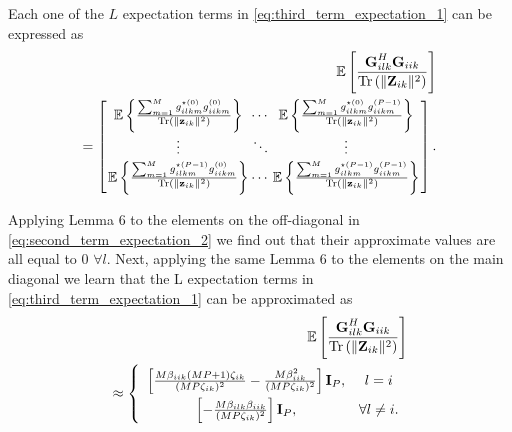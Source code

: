 \documentclass[10pt,journal,comsoc,final]{IEEEtran}
\DeclareMathOperator{\Tr}{Tr}
\begin{document}
Each one of the $L$ expectation terms in \eqref{eq:third_term_expectation_1} can be expressed as
\begin{equation}\label{eq:second_term_expectation_2}
\begin{split}
\mathbb{E} \left[ \frac{ \textbf{G}_{ilk}^{H} \textbf{G}_{iik}}{\Tr \left( \lVert \textbf{Z}_{ik} \rVert^{2} \right)} \right] \\ = 
\arraycolsep=1pt\def\arraystretch{1.5}
\left[\begin{array}{ccc} \mathbb{E} \left\lbrace \frac{\sum_{m=1}^{M} g_{ilkm}^{\star (0)} g_{iikm}^{(0)} }{\Tr \left( \lVert \textbf{z}_{ik} \rVert^{2} \right)} \right\rbrace & \cdots & \mathbb{E} \left\lbrace \frac{\sum_{m=1}^{M} g_{ilkm}^{\star (0)}g_{iikm}^{(P-1)} }{\Tr \left( \lVert \textbf{z}_{ik} \rVert^{2} \right)} \right\rbrace \\
\vdots & \ddots & \vdots \\
\mathbb{E} \left\lbrace \frac{\sum_{m=1}^{M} g_{ilkm}^{\star(P-1)}g_{iikm}^{(0)} }{\Tr \left( \lVert \textbf{z}_{ik} \rVert^{2} \right)}\right\rbrace & \cdots & \mathbb{E} \left\lbrace \frac{\sum_{m=1}^{M} g_{ilkm}^{\star (P-1)}g_{iikm}^{(P-1)} }{\Tr \left( \lVert \textbf{z}_{ik} \rVert^{2} \right)} \right\rbrace
\end{array} \right].
\end{split}
\end{equation}

Applying Lemma 6 to the elements on the off-diagonal in \eqref{eq:second_term_expectation_2} we find out that their approximate values are all equal to 0 $\forall l$. Next, applying the same Lemma 6 to the elements on the main diagonal we learn that the L expectation terms in \eqref{eq:third_term_expectation_1} can be approximated as
\begin{equation}\label{eq:second_term_expectation_3}
\begin{split}
\mathbb{E} \left[ \frac{ \textbf{G}_{ilk}^{H} \textbf{G}_{iik}}{\Tr \left( \lVert \textbf{Z}_{ik} \rVert^{2} \right)} \right] \\ \approx \left\{
\def\arraystretch{1.7}
\begin{array}{cc}
\left[ \frac{M\beta_{iik}(MP+1) \zeta_{ik}}{(MP \zeta_{ik})^{2}} - \frac{M \beta_{iik}^{2}}{(MP \zeta_{ik})^{2}} \right] \textbf{I}_{P},  & l = i\\
\left[-\frac{M \beta_{ilk} \beta_{iik}}{(MP \zeta_{ik})^{2}} \right] \textbf{I}_{P}, & \forall l \neq i.
\end{array}\right.
\end{split}
\end{equation}
\end{document}
